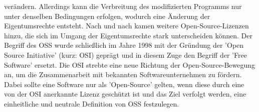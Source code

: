 verändern. \cite{free_software_fondation_gnu-manifest_2016} Allerdings kann die Verbreitung des modifizierten Programms nur unter denselben Bedingungen erfolgen, wodurch eine Änderung der Eigentumsrechte entsteht. Nach und nach kamen weitere Open-Source-Lizenzen hinzu, die sich im Umgang der Eigentumsrechte stark unterscheiden können. Der Begriff des OSS wurde schließlich im Jahre 1998 mit der Gründung der 'Open Source Initiative' (kurz: OSI) \cite{open_source_inititative_open_2018} geprägt und in diesem Zuge den Begriff der 'Free Software' ersetzt. \cite{raymond_cathedral_2001} Die OSI strebte eine neue Richtung der Open-Source-Bewegung an, um die Zusammenarbeit mit bekannten Softwareunternehmen zu fördern. Dabei sollte eine Software nur als 'Open-Source' gelten, wenn diese durch eine von der OSI anerkannte Lizenz geschützt ist und das Ziel verfolgt werden, eine einheitliche und neutrale Definition von OSS festzulegen. \cite[S. 262]{buxmann_softwareindustrie_2015}






